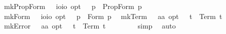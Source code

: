 \begin{isabellebody}
\isamarkuptrue%
\isamarkupfalse%
\ mkPropForm\ {\isacharcolon}{\isacharcolon}\ \ {\isachardoublequoteopen}io{\isasymRightarrow}io\ opt{\isachardoublequoteclose}\ \ \ {\isachardoublequoteopen}{\isacharcomma}p{\isacharcomma}\ {\isasymequiv}\ PropForm\ p{\isachardoublequoteclose}\ \isanewline
{}\isamarkupfalse%
\ mkForm\ {\isacharcolon}{\isacharcolon}\ \ {\isachardoublequoteopen}io{\isasymRightarrow}io\ opt{\isachardoublequoteclose}\ \ \ {\isachardoublequoteopen}{\isacharsemicolon}p{\isacharsemicolon}\ {\isasymequiv}\ Form\ p{\isachardoublequoteclose}\ \isanewline
{}\isamarkupfalse%
\ mkTerm\ {\isacharcolon}{\isacharcolon}\ \ {\isachardoublequoteopen}{\isacharprime}a{\isasymRightarrow}{\isacharprime}a\ opt{\isachardoublequoteclose}\ \ \ {\isachardoublequoteopen}{\isachardot}t{\isachardot}\ {\isasymequiv}\ Term\ t{\isachardoublequoteclose}\ \isanewline
{}\isamarkupfalse%
\ mkError\ {\isacharcolon}{\isacharcolon}\ \ {\isachardoublequoteopen}{\isacharprime}a{\isasymRightarrow}{\isacharprime}a\ opt{\isachardoublequoteclose}\ \ \ {\isachardoublequoteopen}{\isacharasterisk}t{\isacharasterisk}\ {\isasymequiv}\ Term\ t{\isachardoublequoteclose}%
\isamarkuptrue%
%
\isamarkuptrue%
\isamarkupfalse%
\ {\isachardoublequoteopen}{\isacharparenleft}{\isasymforall}{\isasymphi}{\isachardot}\ {\isacharbrackleft}{\isacharcomma}{\isasymphi}{\isacharcomma}{\isacharbrackright}{\isacharparenright}\ {\isasymlongleftrightarrow}\ {\isacharbrackleft}{\isasymforall}{\isacharparenleft}{\isasymlambda}{\isasymphi}{\isachardot}\ {\isacharcomma}{\isasymphi}{\isacharcomma}{\isacharparenright}{\isacharbrackright}{\isachardoublequoteclose}%
\isadelimproof
\ %
\endisadelimproof
%
\isatagproof
{}\isamarkupfalse%
\ simp\ \isamarkupfalse%
\ auto%
\endisatagproof
{\isafoldproof}%
%
\isadelimproof
%
\endisadelimproof
\ \isanewline
{}\isamarkupfalse%
\ {\isachardoublequoteopen}{\isacharparenleft}{\isasymforall}{\isasymphi}{\isachardot}\ {\isacharbrackleft}{\isacharsemicolon}{\isasymphi}{\isacharsemicolon}{\isacharbrackright}{\isacharparenright}\ {\isasymlongleftrightarrow}\ {\isacharbrackleft}{\isasymforall}{\isacharparenleft}{\isasymlambda}{\isasymphi}{\isachardot}\ {\isacharsemicolon}{\isasymphi}{\isacharsemicolon}{\isacharparenright}{\isacharbrackright}{\isachardoublequoteclose}%

\end{isabellebody}
